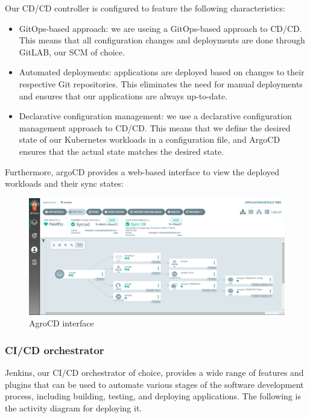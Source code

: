 Our CD/CD controller is configured to feature the following characteristics:  
\begin{itemize}[label={--}]
\item GitOps-based approach: we are useing a GitOps-based approach to CD/CD. This means that all configuration changes and deployments are done through GitLAB, our SCM of choice. 
\item Automated deployments: applications are deployed based on changes to their respective Git repositories. This eliminates the need for manual deployments and ensures that our applications are always up-to-date. 
\item Declarative configuration management: we use a declarative configuration management approach to CD/CD. This means that we define the desired state of our Kubernetes workloads in a configuration file, and ArgoCD ensures that the actual state matches the desired state. 
\end{itemize}

Furthermore, argoCD provides a web-based interface to view the deployed workloads and their sync states: 

\begin{figure}[H]\centering
\includegraphics[width=1.0\textwidth,angle=00]{assets/f43.png}
\caption{ AgroCD interface }
\label{fig:AgroCD interface}
\end{figure}
 

\subsubsection{CI/CD orchestrator }

Jenkins, our CI/CD orchestrator of choice, provides a wide range of features and plugins that can be used to automate various stages of the software development process, including building, testing, and deploying applications. The following is the activity diagram for deploying it. 

